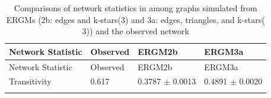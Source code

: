 \documentclass[12pt,twoside]{amherstthesis}
\begin{document}
  \begin{longtable}[]{@{}llll@{}}
  \caption{Comparisons of network statistics in among graphs simulated
  from ERGMs (2b: edges and k-stars(3) and 3a: edges, triangles, and
  k-stars(\(3\))) and the observed network
  \label{tab:ergm2b3a}}\tabularnewline
  \toprule
  \begin{minipage}[b]{0.28\columnwidth}\raggedright\strut
  Network Statistic\strut
  \end{minipage} & \begin{minipage}[b]{0.11\columnwidth}\raggedright\strut
  Observed\strut
  \end{minipage} & \begin{minipage}[b]{0.24\columnwidth}\raggedright\strut
  ERGM2b\strut
  \end{minipage} & \begin{minipage}[b]{0.26\columnwidth}\raggedright\strut
  ERGM3a\strut
  \end{minipage}\tabularnewline
  \midrule
  \endfirsthead
  \toprule
  \begin{minipage}[b]{0.28\columnwidth}\raggedright\strut
  Network Statistic\strut
  \end{minipage} & \begin{minipage}[b]{0.11\columnwidth}\raggedright\strut
  Observed\strut
  \end{minipage} & \begin{minipage}[b]{0.24\columnwidth}\raggedright\strut
  ERGM2b\strut
  \end{minipage} & \begin{minipage}[b]{0.26\columnwidth}\raggedright\strut
  ERGM3a\strut
  \end{minipage}\tabularnewline
  \midrule
  \endhead
  \begin{minipage}[t]{0.28\columnwidth}\raggedright\strut
  Transitivity\strut
  \end{minipage} & \begin{minipage}[t]{0.11\columnwidth}\raggedright\strut
  0.617\strut
  \end{minipage} & \begin{minipage}[t]{0.24\columnwidth}\raggedright\strut
  0.3787 \(\pm\) 0.0013\strut
  \end{minipage} & \begin{minipage}[t]{0.26\columnwidth}\raggedright\strut
  0.4891 \(\pm\) 0.0020\strut
  \end{minipage}\tabularnewline
  \begin{minipage}[t]{0.28\columnwidth}\raggedright\strut

\end{minipage}
\end{longtable}
\end{document}

